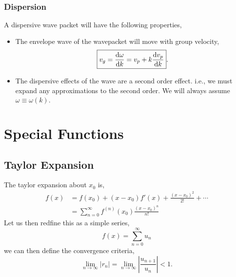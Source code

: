 \documentclass{book}
\begin{document}
\subsection{Dispersion}
A dispersive wave packet will have the following properties,
\begin{itemize}
	\item The envelope wave of the wavepacket will move with group velocity,
	\begin{equation}
		\boxed{v_g = \dv{\omega}{k} = v_p + k\dv{v_p}{k}}.
	\end{equation}
	\item The dispersive effects of the wave are a second order effect. i.e., we must expand any approximations to the second order. We will always assume $\omega \equiv \omega(k)$.
\end{itemize}
\chapter{Special Functions}
\section{Taylor Expansion}
The taylor expansion about $x_0$ is,
\begin{equation}
	\begin{split}
		f(x) & = f(x_0) + (x-x_0)f'(x) + \frac{(x-x_0)^2}{2!} + \cdots \\
		& = \sum_{n=0}^{\infty}f^{(n)}(x_0)\frac{(x-x_0)^n}{n!}
	\end{split}
\end{equation}
Let us then redfine this as a simple series,
\begin{equation}
	f(x) = \sum_{n=0}^{\infty}u_n
\end{equation}
we can then define the convergence criteria,
\begin{equation}
	\lim_{n\to\infty}|r_n| = \lim_{n\to\infty}\left|\frac{u_{n+1}}{u_n}\right| < 1.
\end{equation}
\end{document}
